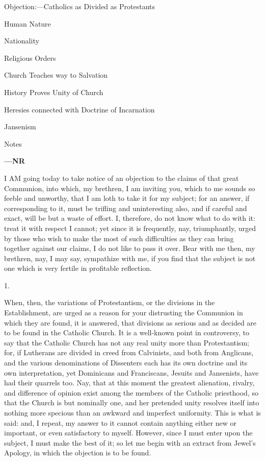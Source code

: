 
Objection:—Catholics as Divided as
Protestants

Human Nature

Nationality

Religious Orders

Church Teaches way to Salvation

History Proves Unity of Church

Heresies connected
with Doctrine of Incarnation

Jansenism

Notes

\textbf{—NR}

I AM going today to take notice of an objection to the claims of
that great Communion, into which, my brethren, I am inviting you,
which to me sounds so feeble and unworthy, that I am loth to take it
for my subject; for an answer, if corresponding to it, must be
trifling and uninteresting also, and if careful and exact, will be but
a waste of effort. I, therefore, do not know what to do with it: treat
it with respect I cannot; yet since it is frequently, nay,
triumphantly, urged by those who wish to make the most of such
difficulties as they can bring together against our claims, I do not
like to pass it over. Bear with me then, my brethren, nay, I may say,
sympathize with me, if you find that the subject is not one which is
very fertile in profitable reflection.

1.

When, then, the variations of Protestantism, or the divisions in
the Establishment, are urged as a reason for your distrusting the
Communion in which they are found, it is answered, that divisions as
serious and as decided are to be found in the Catholic Church. It is a
well-known point in controversy, to say that the Catholic Church has
not any real unity more than Protestantism; for, if Lutherans are
divided in creed from Calvinists, and both from Anglicans, and the
various denominations of Dissenters each has its own doctrine and its
own interpretation, yet Dominicans and Franciscans, Jesuits and
Jansenists, have had their quarrels too. Nay, that at this moment the
greatest alienation, rivalry, and difference of opinion exist among
the members of the Catholic priesthood, so that the Church is but
nominally one, and her pretended unity resolves itself into nothing
more specious than an awkward and imperfect uniformity. This is what
is said: and, I repeat, my answer to it cannot contain anything either
new or important, or even satisfactory to myself. However, since I
must enter upon the subject, I must make the best of it; so let me
begin with an extract from Jewel's Apology, in which the objection is
to be found.

